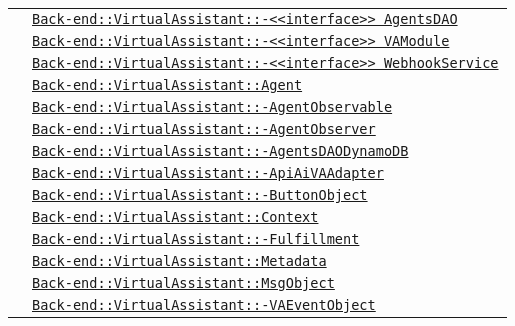 \begin{longtable}{|>{\centering}m{3cm}|m{10cm}<{\centering}|}
& \hyperref[Back-end::VirtualAssistant::<<interface>> AgentsDAO]{\texttt{Back-end::VirtualAssistant::-\linebreak <<interface>> AgentsDAO}}\\
& \hyperref[Back-end::VirtualAssistant::<<interface>> VAModule]{\texttt{Back-end::VirtualAssistant::-\linebreak <<interface>> VAModule}}\\
& \hyperref[Back-end::VirtualAssistant::<<interface>> WebhookService]{\texttt{Back-end::VirtualAssistant::-\linebreak <<interface>> WebhookService}}\\
& \hyperref[Back-end::VirtualAssistant::Agent]{\texttt{Back-end::VirtualAssistant::Agent}}\\
& \hyperref[Back-end::VirtualAssistant::AgentObservable]{\texttt{Back-end::VirtualAssistant::-\linebreak AgentObservable}}\\
& \hyperref[Back-end::VirtualAssistant::AgentObserver]{\texttt{Back-end::VirtualAssistant::-\linebreak AgentObserver}}\\
& \hyperref[Back-end::VirtualAssistant::AgentsDAODynamoDB]{\texttt{Back-end::VirtualAssistant::-\linebreak AgentsDAODynamoDB}}\\
& \hyperref[Back-end::VirtualAssistant::ApiAiVAAdapter]{\texttt{Back-end::VirtualAssistant::-\linebreak ApiAiVAAdapter}}\\
& \hyperref[Back-end::VirtualAssistant::ButtonObject]{\texttt{Back-end::VirtualAssistant::-\linebreak ButtonObject}}\\
& \hyperref[Back-end::VirtualAssistant::Context]{\texttt{Back-end::VirtualAssistant::Context}}\\
& \hyperref[Back-end::VirtualAssistant::Fulfillment]{\texttt{Back-end::VirtualAssistant::-\linebreak Fulfillment}}\\
& \hyperref[Back-end::VirtualAssistant::Metadata]{\texttt{Back-end::VirtualAssistant::Metadata}}\\
& \hyperref[Back-end::VirtualAssistant::MsgObject]{\texttt{Back-end::VirtualAssistant::MsgObject}}\\
& \hyperref[Back-end::VirtualAssistant::VAEventObject]{\texttt{Back-end::VirtualAssistant::-\linebreak VAEventObject}}\\

\end{longtable}
